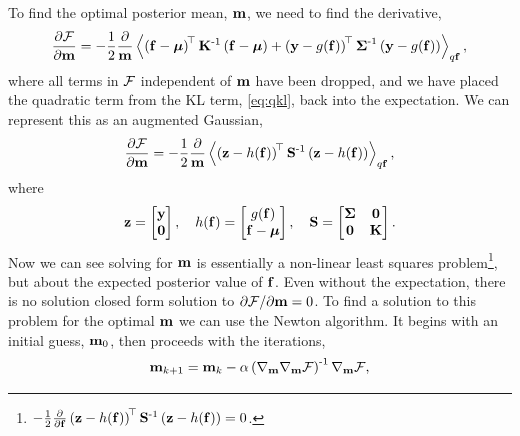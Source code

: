 \documentclass{article} %
\begin{document}
To find the optimal posterior mean, $\pomean$, we need to find the derivative,
\begin{equation}
    \frac{\partial\Fengy}{\partial\pomean} = -\frac{1}{2}
    \frac{\partial}{\pomean} \expec{q\lstate}{
        \brac{\lstate - \prmean}\transpose\prcov\inv
        \brac{\lstate - \prmean}
        + \brac{\obs - \nonlin{\lstate}}\transpose \lcov\inv
            \brac{\obs - \nonlin{\lstate}}},
\end{equation}
where all terms in $\Fengy$ independent of $\pomean$ have been dropped, and we
have placed the quadratic term from the KL term, \eqref{eq:qkl}, back into the
expectation. We can represent this as an augmented Gaussian,
\begin{equation}
    \frac{\partial\Fengy}{\partial\pomean} = -\frac{1}{2}
        \frac{\partial}{\pomean}
        \expec{q\lstate}{
        \brac{\augobs - \augnonlin{\lstate}}\transpose\augcov\inv
        \brac{\augobs - \augnonlin{\lstate}}
    },
    \label{eq:augsys}
\end{equation}
where
\begin{equation}
    \augobs = \begin{bmatrix} \obs \\ \mathbf{0} \end{bmatrix}, \quad
    \augnonlin{\lstate} = \begin{bmatrix} \nonlin{\lstate} \\ \lstate - \prmean 
        \end{bmatrix}, \quad
    \augcov = \begin{bmatrix} \lcov & \mathbf{0} \\ \mathbf{0} & \prcov 
        \end{bmatrix}.
\end{equation}
Now we can see solving for $\pomean$ is essentially a non-linear least squares 
problem\footnote{$-\frac{1}{2}
        \frac{\partial}{\partial\lstate}
        \brac{\augobs - \augnonlin{\lstate}}\transpose\augcov\inv
        \brac{\augobs - \augnonlin{\lstate}} = 0$.}, but about
the expected posterior value of $\lstate$. Even without the expectation, there
is no solution closed form solution to $\partial\Fengy/\partial\pomean = 0$.
To find a solution to this problem for the optimal $\pomean$ we can use the
Newton algorithm. It begins with an initial guess, $\pomean_0$, then proceeds
with the iterations,
\begin{equation}
    \pomean_{k+1} = \pomean_k -
    \step\brac{\nabla_\pomean\nabla_\pomean\Fengy}\inv \nabla_\pomean\Fengy,
    \label{eq:newton}
\end{equation}
\end{document}
